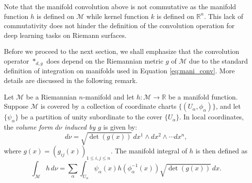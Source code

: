 
Note that the manifold convolution above is not commutative as the manifold function $h$ is defined on $\mathcal{M}$ while kernel function $k$ is defined on $\mathbb{R}^n$. This lack of commutativity does not hinder the definition of the convolution operation for deep learning tasks on Riemann surfaces. 


Before we proceed to the next section, we shall emphasize that the convolution operator $*_{d,g}$ does depend on the Riemannian metric $g$ of $\mathcal{M}$ due to the standard definition of integration on manifolds used in Equation \ref{eq:mani_conv}. More details are discussed in the following remark.
\begin{remark}\label{rm:volume_form}
    Let $\mathcal{M}$ be a Riemannian $n$-manifold and let $h: \mathcal{M} \to \mathbb{R}$ be a manifold function. 
    Suppose $\mathcal{M}$ is covered by a collection of coordinate charts $\{(U_\alpha, \phi_\alpha)\}$, and let $\{\psi_\alpha\}$ be a partition of unity subordinate to the cover $\{U_\alpha\}$. In local coordinates, the {\it volume form $d\nu$ induced by $g$} is given by:
\begin{equation}
d\nu =  \sqrt{\det(g(x))} \, dx^1 \wedge dx^2 \wedge \cdots dx^n,
\end{equation}
\noindent where $g(x)=(g_{ij}(x))_{1\leq i,j\leq n}$. The manifold integral of $h$ is then defined as
    \begin{equation}
    \int_\mathcal{M} h \, d\nu = \sum_\alpha \int_{U_\alpha} \psi_\alpha(x) h(\phi_\alpha^{-1}(x)) \sqrt{\det(g(x))} \, dx.
    \end{equation}
  \end{remark}

